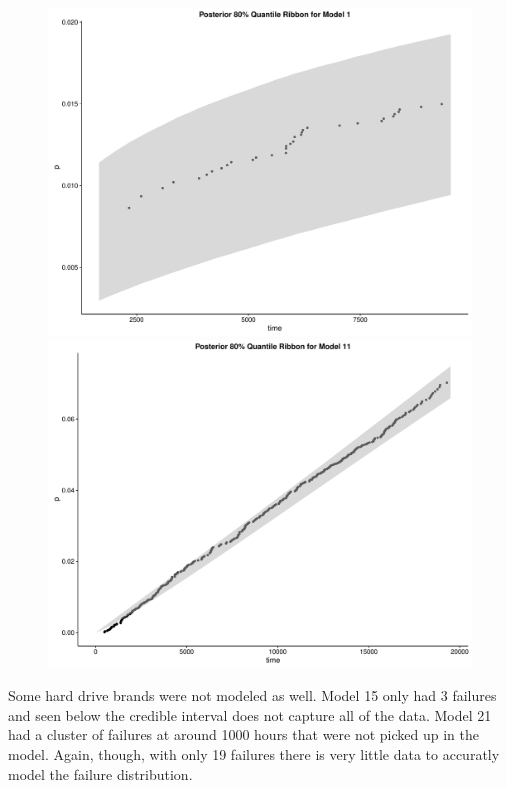 \documentclass{scrartcl}
\begin{document}
\begin{figure}[H]
  \centering
  \begin{minipage}[b]{0.4\textwidth}
    \includegraphics[width=\textwidth]{plot1.pdf}
  \end{minipage}
  \hfill
  \begin{minipage}[b]{0.4\textwidth}
    \includegraphics[width=\textwidth]{plot2.pdf}
  \end{minipage}
\end{figure}

\noindent Some hard drive brands were not modeled as well.  Model 15 only had 3 failures and seen below the credible interval does not capture all of the data.  Model 21 had a cluster of failures at around 1000 hours that were not picked up in the model.  Again, though, with only 19 failures there is very little data to accuratly model the failure distribution.  
\end{document}
